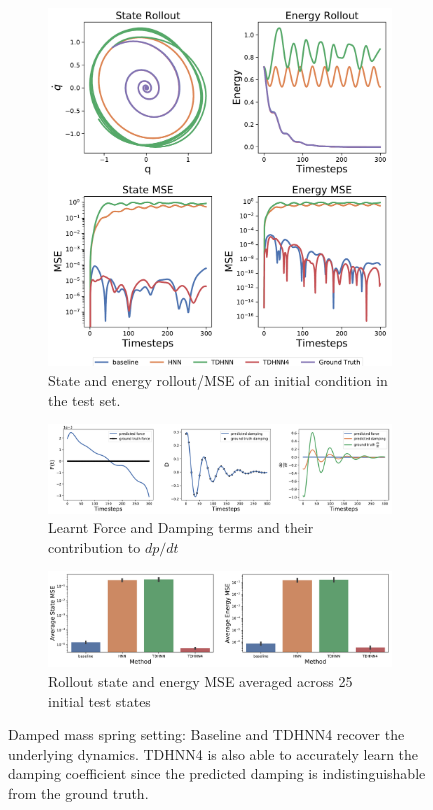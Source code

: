 \documentclass[twoside]{article}
\begin{document}
\begin{figure}[h!]
\centering
\captionsetup{justification=centering}
	\begin{subfigure}[b]{0.4\textwidth}
		\centering
		\includegraphics[width=\textwidth]{figures/damped_1_pred.pdf}
		\caption{State and energy rollout/MSE of an initial condition in the test set.}
	\end{subfigure}
	\begin{subfigure}[b]{0.48\textwidth}
		\centering
		\includegraphics[width=\textwidth]{figures/dpdt_damped.pdf}
		\caption{Learnt Force and Damping terms and their contribution to $dp/dt$}
	\end{subfigure}
	\begin{subfigure}[b]{0.48\textwidth}
	    \centering
		\includegraphics[width=\textwidth]{figures/damped_1_errors.pdf}
		\caption{Rollout state and energy MSE averaged across 25 initial test states}
	\end{subfigure}
\caption{Damped mass spring setting: Baseline and TDHNN4 recover the underlying dynamics. TDHNN4 is also able to accurately learn the damping coefficient since the predicted damping is indistinguishable from the ground truth.}
\label{damped}
\end{figure}
\end{document}
